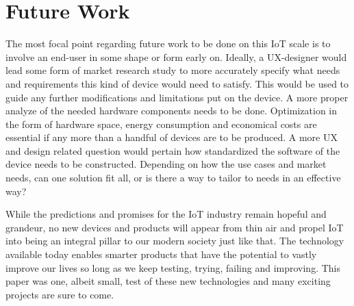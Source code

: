 \iffalse
\begin{itemize}
	\item Critique
	\item Discussion
	\item Do not make the reader do all the work
\end{itemize}
\fi

\section{Future Work}
The most focal point regarding future work to be done on this IoT scale is to involve an end-user in some shape or form early on. Ideally, a UX-designer would lead some form of market research study to more accurately specify what needs and requirements this kind of device would need to satisfy. This would be used to guide any further modifications and limitations put on the device.
A more proper analyze of the needed hardware components needs to be done. Optimization in the form of hardware space, energy consumption and economical costs are essential if any more than a handful of devices are to be produced.
A more UX and design related question would pertain how standardized the software of the device needs to be constructed. Depending on how the use cases and market needs, can one solution fit all, or is there a way to tailor to needs in an effective way?


While the predictions and promises for the IoT industry remain hopeful and grandeur, no new devices and products will appear from thin air and propel IoT into being an integral pillar to our modern society just like that. The technology available today enables smarter products that have the potential to vastly improve our lives so long as we keep testing, trying, failing and improving. This paper was one, albeit small, test of these new technologies and many exciting projects are sure to come.